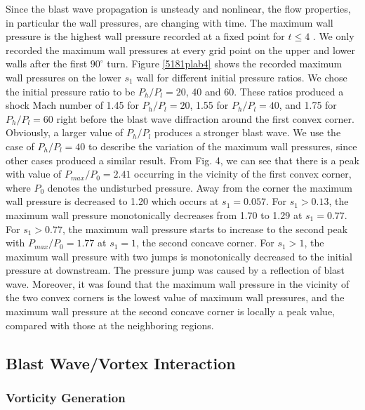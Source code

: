 \documentclass[runningheads]{svmult}
\begin{document}
   Since the blast wave propagation is unsteady and nonlinear, the flow properties, in particular the wall pressures, are changing with time. The maximum wall pressure is the highest wall pressure recorded at a fixed point for \(t \leq  4 \) . We only recorded the maximum wall pressures at every grid point on the upper and lower walls after the first $90^\circ$ turn. Figure \ref{5181plab4} shows the recorded maximum wall pressures on the lower $s_1$ wall for different initial pressure ratios. We chose the initial pressure ratio to be \(P_h/P_l=20 \), 40 and 60. These ratios produced a shock Mach number of 1.45 for \(P_h/P_l=20 \), 1.55 for \(P_h/P_l=40 \), and 1.75 for \(P_h/P_l=60 \) right before the blast wave diffraction around the first convex corner. Obviously, a larger value of \(P_h/P_l \) produces a stronger blast wave. We use the case of \(P_h/P_l=40 \) to describe the variation of the maximum wall pressures, since other cases produced a similar result. From Fig. 4, we can see that there is a peak with value of  \(P_{max}/P_0=2.41 \) occurring in the vicinity of the first convex corner, where $P_0$ denotes the undisturbed pressure. Away from the corner the maximum wall pressure is decreased to 1.20 which occurs at \(s_1 = 0.057 \). For \(s_1 > 0.13 \), the maximum wall pressure monotonically decreases from 1.70 to 1.29 at \(s_1 = 0.77 \). For \(s_1 > 0.77 \), the maximum wall pressure starts to increase to the second peak with \(P_{max}/P_0=1.77 \) at \(s_1 = 1 \), the second concave corner. For \(s_1 > 1 \), the maximum wall pressure with two jumps is monotonically decreased to the initial pressure at downstream. The pressure jump was caused by a reflection of blast wave. Moreover, it was found that the maximum wall pressure in the vicinity of the two convex corners is the lowest value of maximum wall pressures, and the maximum wall pressure at the second concave corner is locally a peak value, compared with those at the neighboring regions.

\subsection{Blast Wave/Vortex Interaction}

\subsubsection*{Vorticity Generation}
\end{document}

